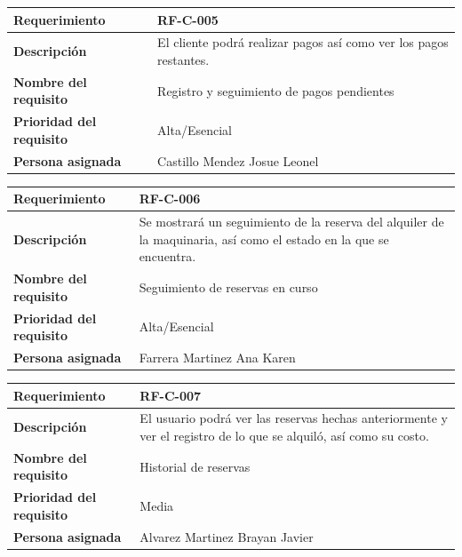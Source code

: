 \documentclass{article}
\begin{document}
\begin{center}
\begin{tabular}{|p{3cm}|p{9cm}|}
\hline
\textbf{Requerimiento} & RF-C-005 \\
\hline
\textbf{Descripción} & El cliente podrá realizar pagos así como ver los pagos restantes. \\
\hline
\textbf{Nombre del requisito} & Registro y seguimiento de pagos pendientes \\
\hline
\textbf{Prioridad del requisito} & Alta/Esencial \\
\hline
\textbf{Persona asignada} & Castillo Mendez Josue Leonel \\
\hline
\end{tabular}
\end{center}

\begin{center}
\begin{tabular}{|p{3cm}|p{9cm}|}
\hline
\textbf{Requerimiento} & RF-C-006 \\
\hline
\textbf{Descripción} & Se mostrará un seguimiento de la reserva del alquiler de la maquinaria, así como el estado en la que se encuentra. \\
\hline
\textbf{Nombre del requisito} & Seguimiento de reservas en curso  \\
\hline
\textbf{Prioridad del requisito} & Alta/Esencial \\
\hline
\textbf{Persona asignada} & Farrera Martinez Ana Karen \\
\hline
\end{tabular}
\end{center}

\begin{center}
\begin{tabular}{|p{3cm}|p{9cm}|}
\hline
\textbf{Requerimiento} & RF-C-007 \\
\hline
\textbf{Descripción} & El usuario podrá ver las reservas hechas anteriormente y ver el registro de lo que se alquiló, así como su costo. \\
\hline
\textbf{Nombre del requisito} & Historial de reservas \\
\hline
\textbf{Prioridad del requisito} & Media \\
\hline
\textbf{Persona asignada} & Alvarez Martinez Brayan Javier \\
\hline
\end{tabular}
\end{center}
\end{document}

